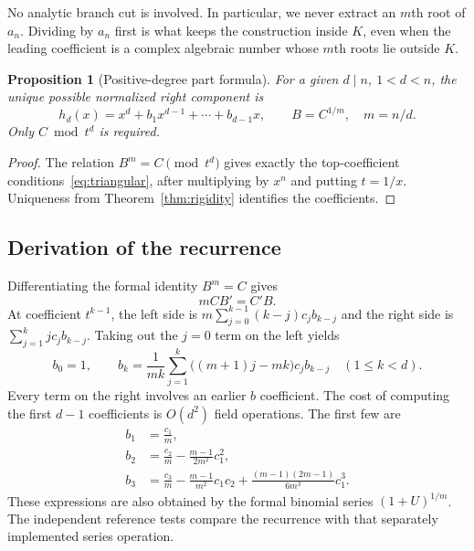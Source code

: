 \documentclass[11pt,letterpaper]{article}
\newtheorem{proposition}[theorem]{Proposition}
\theoremstyle{definition}
\theoremstyle{remark}
\begin{document}
No analytic branch cut is involved. In particular, we never extract an
$m$th root of $a_n$. Dividing by $a_n$ first is what keeps the
construction inside $K$, even when the leading coefficient is a complex
algebraic number whose $m$th roots lie outside $K$.

\begin{proposition}[Positive-degree part formula]\label{prop:formal}
For a given $d\mid n$, $1<d<n$, the unique possible normalized right
component is
\begin{equation}\label{eq:h}
 h_d(x)=x^d+b_1x^{d-1}+\cdots+b_{d-1}x,
 \qquad B=C^{1/m},\quad m=n/d.
\end{equation}
Only $C\bmod t^d$ is required.
\end{proposition}

\begin{proof}
The relation $B^m=C\pmod{t^d}$ gives exactly the top-coefficient
conditions~\eqref{eq:triangular}, after multiplying by $x^n$ and
putting $t=1/x$. Uniqueness from Theorem~\ref{thm:rigidity} identifies
the coefficients.
\end{proof}

\subsection{Derivation of the recurrence}
Differentiating the formal identity $B^m=C$ gives
\[
 mCB'=C'B.
\]
At coefficient $t^{k-1}$, the left side is
$m\sum_{j=0}^{k-1}(k-j)c_jb_{k-j}$ and the right side is
$\sum_{j=1}^{k}j c_jb_{k-j}$. Taking out the $j=0$ term on the
left yields
\begin{equation}\boxed{\displaystyle
 b_0=1,\qquad
 b_k=\frac{1}{mk}\sum_{j=1}^{k}
       \bigl((m+1)j-mk\bigr)c_jb_{k-j}
 \quad(1\leq k<d).}\label{eq:recurrence}
\end{equation}
Every term on the right involves an earlier $b$ coefficient. The cost
of computing the first $d-1$ coefficients is $O(d^2)$ field operations.
The first few are
\begin{align}
 b_1&=\frac{c_1}{m},\label{eq:b1}\\
 b_2&=\frac{c_2}{m}-\frac{m-1}{2m^2}c_1^2,\label{eq:b2}\\
 b_3&=\frac{c_3}{m}-\frac{m-1}{m^2}c_1c_2
       +\frac{(m-1)(2m-1)}{6m^3}c_1^3.\label{eq:b3}
\end{align}
These expressions are also obtained by the formal binomial series
$(1+U)^{1/m}$. The independent reference tests compare the recurrence
with that separately implemented series operation.
\end{document}

